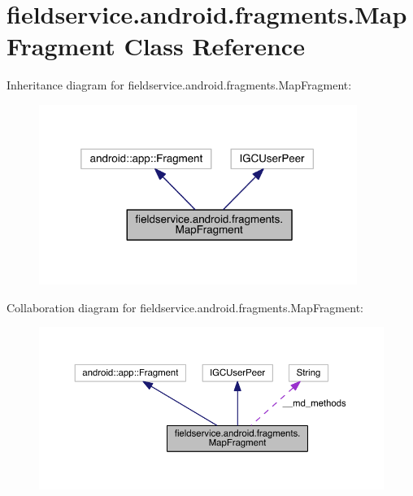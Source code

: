 \hypertarget{classfieldservice_1_1android_1_1fragments_1_1_map_fragment}{\section{fieldservice.\+android.\+fragments.\+Map\+Fragment Class Reference}
\label{classfieldservice_1_1android_1_1fragments_1_1_map_fragment}
}


Inheritance diagram for fieldservice.\+android.\+fragments.\+Map\+Fragment\+:
\nopagebreak
\begin{figure}[H]
\begin{center}
\leavevmode
\includegraphics[width=293pt]{classfieldservice_1_1android_1_1fragments_1_1_map_fragment__inherit__graph}
\end{center}
\end{figure}


Collaboration diagram for fieldservice.\+android.\+fragments.\+Map\+Fragment\+:
\nopagebreak
\begin{figure}[H]
\begin{center}
\leavevmode
\includegraphics[width=350pt]{classfieldservice_1_1android_1_1fragments_1_1_map_fragment__coll__graph}
\end{center}
\end{figure}
